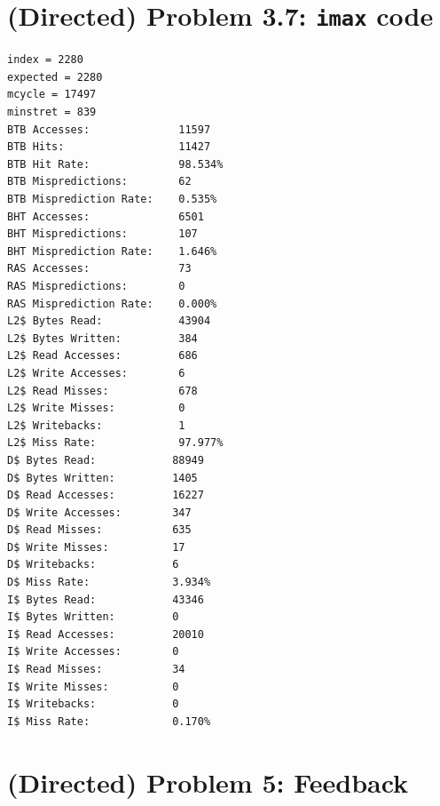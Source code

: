 \documentclass[11pt]{article}
\begin{document}
\section*{(Directed) Problem 3.7: \texttt{imax} code}
\begin{verbatim}
index = 2280
expected = 2280
mcycle = 17497
minstret = 839
BTB Accesses:              11597
BTB Hits:                  11427
BTB Hit Rate:              98.534%
BTB Mispredictions:        62
BTB Misprediction Rate:    0.535%
BHT Accesses:              6501
BHT Mispredictions:        107
BHT Misprediction Rate:    1.646%
RAS Accesses:              73
RAS Mispredictions:        0
RAS Misprediction Rate:    0.000%
L2$ Bytes Read:            43904
L2$ Bytes Written:         384
L2$ Read Accesses:         686
L2$ Write Accesses:        6
L2$ Read Misses:           678
L2$ Write Misses:          0
L2$ Writebacks:            1
L2$ Miss Rate:             97.977%
D$ Bytes Read:            88949
D$ Bytes Written:         1405
D$ Read Accesses:         16227
D$ Write Accesses:        347
D$ Read Misses:           635
D$ Write Misses:          17
D$ Writebacks:            6
D$ Miss Rate:             3.934%
I$ Bytes Read:            43346
I$ Bytes Written:         0
I$ Read Accesses:         20010
I$ Write Accesses:        0
I$ Read Misses:           34
I$ Write Misses:          0
I$ Writebacks:            0
I$ Miss Rate:             0.170%
\end{verbatim}
\section*{(Directed) Problem 5: Feedback}
\end{document}
